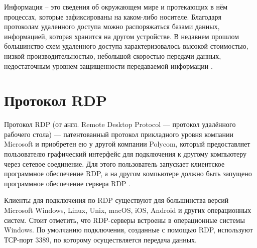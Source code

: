 \documentclass[bachelor, och, coursework]{SCWorks}
\begin{document}


\tableofcontents

\intro
Информация -- это сведения об окружающем мире и протекающих в нём процессах, которые зафиксированы на каком-либо носителе.
Благодаря протоколам удаленного доступа можно распоряжаться базами данных, информацией, которая хранится на другом устройстве. В недавнем прошлом большинство
схем удаленного доступа характеризовалось высокой стоимостью, низкой производительностью, небольшой скоростью передачи данных, недостаточным уровнем защищенности
передаваемой информации \cite{1}.

\section{Протокол RDP}

Протокол RDP (от англ. Remote Desktop Protocol --- протокол удалённого рабочего стола) --- патентованный протокол 
прикладного уровня компании Microsoft и приобретен ею у другой компании Polycom, который предоставляет пользователю графический интерфейс для 
подключения к другому компьютеру через сетевое соединение. Для этого пользователь запускает клиентское программное обеспечение RDP, а на другом 
компьютере должно быть запущено программное обеспечение сервера RDP \cite{2}.

Клиенты для подключения по RDP существуют для большинства версий Microsoft Windows, Linux, Unix, macOS, iOS, Android и 
других операционных систем. Стоит отметить, что RDP-серверы встроены в операционные системы Windows. По умолчанию подключения, созданные с 
помощью RDP, используют ТСР-порт 3389, по которому осуществляется передача данных.

\end{document}
